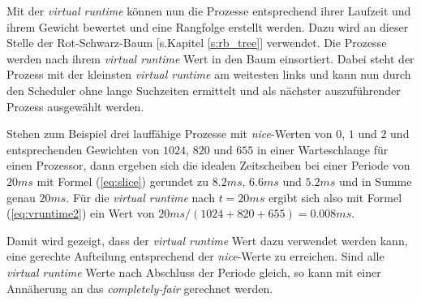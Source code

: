 
Mit der \textit{virtual runtime} können nun die Prozesse entsprechend ihrer Laufzeit und ihrem Gewicht bewertet und eine Rangfolge erstellt werden. Dazu wird an dieser Stelle der Rot-Schwarz-Baum [s.Kapitel \ref{s:rb_tree}] verwendet. Die Prozesse werden nach ihrem \textit{virtual runtime} Wert in den Baum einsortiert. Dabei steht der Prozess mit der kleinsten \textit{virtual runtime} am weitesten links und kann nun durch den Scheduler ohne lange Suchzeiten ermittelt und als nächster auszuführender Prozess ausgewählt werden. 


Stehen zum Beispiel drei lauffähige Prozesse  mit \textit{nice}-Werten von  $0$, $1$ und $2$ und entsprechenden Gewichten von $1024$, $820$ und $655$ in einer Warteschlange für einen Prozessor, dann ergeben sich die idealen Zeitscheiben bei einer Periode von $20ms$ mit Formel (\ref{eq:slice}) gerundet zu $8.2ms$, $6.6ms$ und $5.2ms$ und in Summe genau $20ms$. Für die \textit{virtual runtime} nach $t=20ms$ ergibt sich also mit Formel (\ref{eq:vruntime2}) ein Wert von $20ms/(1024+820+655)=0.008ms$.



Damit wird gezeigt, dass der \textit{virtual runtime} Wert dazu verwendet werden kann, eine gerechte Aufteilung entsprechend der \textit{nice}-Werte zu erreichen. 
Sind alle \textit{virtual runtime} Werte nach Abschluss der Periode gleich, so kann mit einer Annäherung an das \textit{completely-fair} gerechnet werden.



